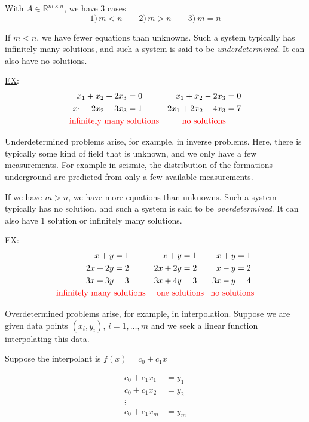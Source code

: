 With $A\in\mathbb{R}^{m\times n}$, we have 3 cases
\begin{equation*}
    1)\, m < n \qquad 2)\, m > n \qquad 3)\ m=n
\end{equation*}

If $m<n$, we have fewer equations than unknowns. Such a system typically has infinitely many solutions, and such a system is said to be \emph{underdetermined}. It can also have no solutions. 

\underline{EX}:
\begin{align*}
    x_1 + x_2 + 2x_3 &= 0 & x_1 + x_2 - 2x_3 &= 0\\
    x_1 - 2x_2 + 3x_3 &= 1 & 2x_1 +2x_2 - 4x_3&=7\\
    \text{\textcolor{red}{infinitely many }}&\text{\textcolor{red}{solutions}}
    & \text{\textcolor{red}{no solutions}}
\end{align*}

Underdetermined problems arise, for example, in inverse problems. Here, there is typically some kind of field that is unknown, and we only have a few measurements. For example in seismic, the distribution of the formations underground are predicted from only a few available measurements. 

If we have $m>n$, we have more equations than unknowns. Such a system typically has no solution, and such a system is said to be \emph{overdetermined}. It can also have 1 solution or infinitely many solutions. 


\underline{EX}:
\begin{align*}
    x+y&=1 & x+y&=1 & x+y&=1 \\
    2x+2y&=2 & 2x+2y&=2 & x-y&=2 \\
    3x+3y&=3 & 3x+4y&=3 & 3x-y&=4 \\
    \text{\textcolor{red}{infinitely many }}&\text{\textcolor{red}{solutions}}
    & &\hspace{-3em}\text{\textcolor{red}{one solutions}}
    & &\hspace{-3em}\text{\textcolor{red}{no solutions}}
\end{align*}

Overdetermined problems arise, for example, in interpolation. Suppose we are given data points $(x_i, y_i),\, i=1, \ldots, m$ and we seek a linear function interpolating this data.  

Suppose the interpolant is $f(x) = c_0 + c_1 x$

\begin{align*}
    c_0 + c_1x_1 &= y_1 \\
    c_0 + c_1x_2 &= y_2 \\
    \vdots\\
    c_0+c_1x_m &= y_m
\end{align*}


